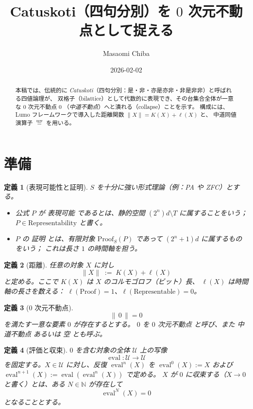 \documentclass[12pt,a4paper]{article}
\newcommand{\dfix}{\mathfrak{0}}          %
\newcommand{\mw}{\mathrel{\overset{\mathrm{mw}}{=}}} %
\newtheorem{definition}{定義}[section]
\begin{document}
\title{Catuskoti（四句分別）を $0$ 次元不動点として捉える}
\author{Masaomi Chiba}
\date{2026-02-02}
\maketitle

\begin{abstract}
本稿では、伝統的に \emph{Catuskoti}（四句分別：是・非・亦是亦非・非是非非）と呼ばれる四値論理が、
双格子（bilattice）として代数的に表現でき、その台集合全体が一意な $0$ 次元不動点 $\dfix$
（\emph{中道不動点}）へと潰れる（collapse）ことを示す。
構成には、Lumo フレームワークで導入した距離関数 $\|X\|=K(X)+\ell(X)$ と、
中道同値演算子 $\mw$ を用いる。
\end{abstract}

\section{準備}

\begin{definition}[表現可能性と証明]
$S$ を十分に強い形式理論（例：PA や ZFC）とする。
\begin{itemize}
  \item 公式 $P$ が \emph{表現可能} であるとは、静的空間 $(2^{n})d\!\setminus\!T$ に属することをいう；
        $P\in\text{Representability}$ と書く。
  \item $P$ の \emph{証明} とは、有限対象 $\text{Proof}_{S}(P)$ であって $(2^{n}+1)d$ に属するものをいう；
        これは長さ $1$ の時間軸を担う。
\end{itemize}
\end{definition}

\begin{definition}[距離]
任意の対象 $X$ に対し
$$
\|X\|\;:=\;K(X)+\ell(X)
$$
と定める。ここで $K(X)$ は $X$ のコルモゴロフ（ビット）長、
$\ell(X)$ は時間軸の長さを数える：
$\ell(\text{Proof})=1$、$\ell(\text{Representable})=0$。
\end{definition}

\begin{definition}[$0$ 次元不動点]
$$
\|\,\dfix\,\|=0
$$
を満たす一意な要素 $\dfix$ が存在するとする。
$\dfix$ を \emph{$0$ 次元不動点} と呼び、また \emph{中道不動点} あるいは \emph{空} とも呼ぶ。
\end{definition}

\begin{definition}[評価と収束]
$\dfix$ を含む対象の全体 $\mathcal{U}$ 上の写像
\[
  \operatorname{eval}:\mathcal{U}\to\mathcal{U}
\]
を固定する。$X\in\mathcal{U}$ に対し、反復 $\operatorname{eval}^n(X)$ を
$\operatorname{eval}^0(X):=X$ および $\operatorname{eval}^{n+1}(X):=\operatorname{eval}(\operatorname{eval}^n(X))$ で定める。
$X$ が $\dfix$ に\emph{収束する}（$X\to\dfix$ と書く）とは、ある $N\in\mathbb{N}$ が存在して
\[
  \operatorname{eval}^N(X)=\dfix
\]
となることとする。
\end{definition}
\end{document}
